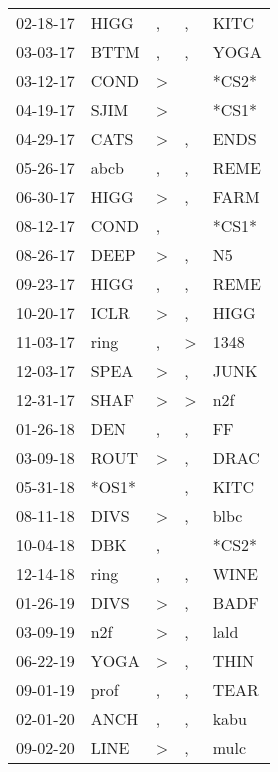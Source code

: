 \begin{supertabular}{lllll}
 02-18-17 &   HIGG &                , &             , &   KITC \\
 03-03-17 &   BTTM &                , &             , &   YOGA \\
 03-12-17 &   COND &     \textgreater &               &  *CS2* \\
 04-19-17 &   SJIM &     \textgreater &               &  *CS1* \\
 04-29-17 &   CATS &     \textgreater &             , &   ENDS \\
 05-26-17 &   abcb &                , &             , &   REME \\
 06-30-17 &   HIGG &     \textgreater &             , &   FARM \\
 08-12-17 &   COND &                , &               &  *CS1* \\
 08-26-17 &   DEEP &     \textgreater &             , &     N5 \\
 09-23-17 &   HIGG &                , &             , &   REME \\
 10-20-17 &   ICLR &     \textgreater &             , &   HIGG \\
 11-03-17 &   ring &                , &  \textgreater &   1348 \\
 12-03-17 &   SPEA &     \textgreater &             , &   JUNK \\
 12-31-17 &   SHAF &     \textgreater &  \textgreater &    n2f \\
 01-26-18 &    DEN &                , &             , &     FF \\
 03-09-18 &   ROUT &     \textgreater &             , &   DRAC \\
 05-31-18 &  *OS1* &                  &             , &   KITC \\
 08-11-18 &   DIVS &     \textgreater &             , &   blbc \\
 10-04-18 &    DBK &                , &               &  *CS2* \\
 12-14-18 &   ring &                , &             , &   WINE \\
 01-26-19 &   DIVS &     \textgreater &             , &   BADF \\
 03-09-19 &    n2f &     \textgreater &             , &   lald \\
 06-22-19 &   YOGA &     \textgreater &             , &   THIN \\
 09-01-19 &   prof &                , &             , &   TEAR \\
 02-01-20 &   ANCH &                , &             , &   kabu \\
 09-02-20 &   LINE &     \textgreater &             , &   mulc \\
\end{supertabular}
